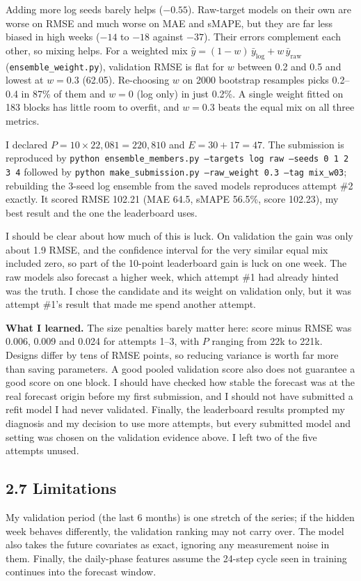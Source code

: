 \documentclass[11pt]{article}
\begin{document}
Adding more log seeds barely helps ($-0.55$). Raw-target models on their own are worse on RMSE and
much worse on MAE and sMAPE, but they are far less biased in high weeks ($-14$ to $-18$ against
$-37$). Their errors complement each other, so mixing helps. For a weighted mix
$\hat y=(1-w)\,\bar y_\text{log} + w\,\bar y_\text{raw}$ (\texttt{ensemble\_weight.py}), validation
RMSE is flat for $w$ between 0.2 and 0.5 and lowest at $w=0.3$ (62.05). Re-choosing $w$ on 2000
bootstrap resamples picks 0.2--0.4 in 87\% of them and $w=0$ (log only) in just 0.2\%. A single
weight fitted on 183 blocks has little room to overfit, and $w=0.3$ beats the equal mix on all
three metrics.

I declared $P = 10\times22{,}081 = 220{,}810$ and $E = 30 + 17 = 47$. The submission is reproduced
by \texttt{python ensemble\_members.py --targets log raw --seeds 0 1 2 3 4} followed by
\texttt{python make\_submission.py --raw\_weight 0.3 --tag mix\_w03}; rebuilding the 3-seed log
ensemble from the saved models reproduces attempt \#2 exactly. It scored RMSE 102.21 (MAE 64.5,
sMAPE 56.5\%, score 102.23), my best result and the one the leaderboard uses.

I should be clear about how much of this is luck. On validation the gain was only about 1.9 RMSE,
and the confidence interval for the very similar equal mix included zero, so part of the 10-point
leaderboard gain is luck on one week. The raw models also forecast a higher week, which attempt
\#1 had already hinted was the truth. I chose the candidate and its weight on validation only, but
it was attempt \#1's result that made me spend another attempt.

\textbf{What I learned.} The size penalties barely matter here: score minus RMSE was 0.006, 0.009
and 0.024 for attempts 1--3, with $P$ ranging from 22k to 221k. Designs differ by tens of RMSE
points, so reducing variance is worth far more than saving parameters. A good pooled validation
score also does not guarantee a good score on one block. I should have checked how stable the
forecast was at the real forecast origin before my first submission, and I should not have
submitted a refit model I had never validated. Finally, the leaderboard results prompted my
diagnosis and my decision to use more attempts, but every submitted model and setting was chosen
on the validation evidence above. I left two of the five attempts unused.

\subsection*{2.7 Limitations}
My validation period (the last 6 months) is one stretch of the series; if the hidden week behaves
differently, the validation ranking may not carry over. The model also takes the future
covariates as exact, ignoring any measurement noise in them. Finally, the daily-phase features
assume the 24-step cycle seen in training continues into the forecast window.
\end{document}
